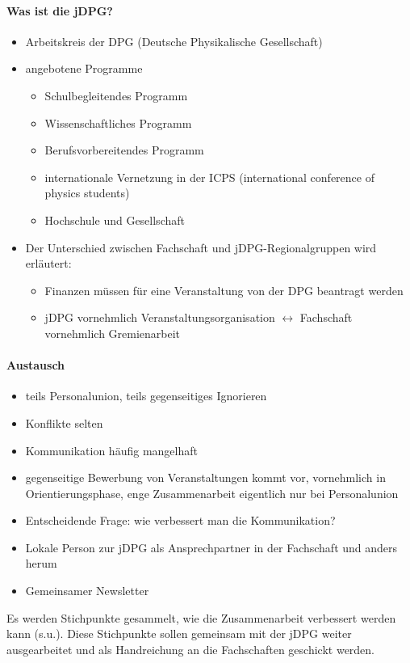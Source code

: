     \paragraph{Was ist die jDPG?}
      \begin{itemize}
        \item Arbeitskreis der DPG (Deutsche Physikalische Gesellschaft)
        \item angebotene Programme
          \begin{itemize}
            \item Schulbegleitendes Programm
            \item Wissenschaftliches Programm
            \item Berufsvorbereitendes Programm
            \item internationale Vernetzung in der ICPS (international conference of physics students)
            \item Hochschule und Gesellschaft
          \end{itemize}
        \item Der Unterschied zwischen Fachschaft und jDPG-Regionalgruppen wird erläutert:
          \begin{itemize}
            \item Finanzen müssen für eine Veranstaltung von der DPG beantragt werden
            \item jDPG vornehmlich Veranstaltungsorganisation $\leftrightarrow$ Fachschaft vornehmlich Gremienarbeit
          \end{itemize}
      \end{itemize}

    \paragraph{Austausch}
      \begin{itemize}
        \item teils Personalunion, teils gegenseitiges Ignorieren
        \item Konflikte selten
        \item Kommunikation häufig mangelhaft
        \item gegenseitige Bewerbung von Veranstaltungen kommt vor, vornehmlich in Orientierungsphase, enge Zusammenarbeit eigentlich nur bei Personalunion
        \item Entscheidende Frage: wie verbessert man die Kommunikation?
        \item Lokale Person zur jDPG als Ansprechpartner in der Fachschaft und anders herum
        \item Gemeinsamer Newsletter
      \end{itemize}
      Es werden Stichpunkte gesammelt, wie die Zusammenarbeit verbessert werden kann (s.u.). Diese Stichpunkte sollen gemeinsam mit der jDPG weiter ausgearbeitet und als Handreichung an die Fachschaften geschickt werden.

